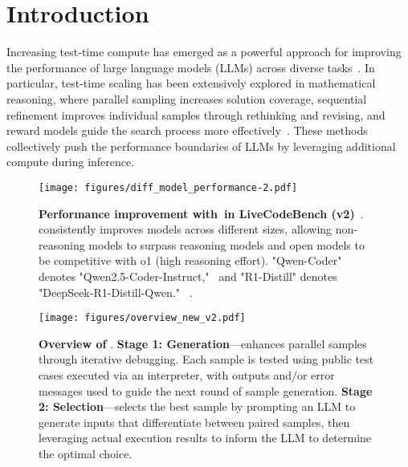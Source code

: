 \section{Introduction}
Increasing test-time compute has emerged as a powerful approach for improving the performance of large language models (LLMs) across diverse tasks~\citep{openai_learning_to_reason_2024, guo2025deepseek,qwen_qwq_2024,muennighoff2025s1,sky_t1_2025,brown2024large,snell2024scaling}. In particular, test-time scaling has been extensively explored in mathematical reasoning, where parallel sampling increases solution coverage, sequential refinement improves individual samples through rethinking and revising, and reward models guide the search process more effectively~\citep{ehrlich2025codemonkeys, snell2024scaling, li2024rethinkmcts}. These methods collectively push the performance boundaries of LLMs by leveraging additional compute during inference.
\begin{figure}[!t]
    \centering
    \texttt{[image: figures/diff\_model\_performance-2.pdf]}      \caption{\textbf{Performance improvement with~\frameworkname in LiveCodeBench (v2)}~\citep{jain2024livecodebench}. \frameworkname consistently improves models across different sizes, allowing non-reasoning models to surpass reasoning models and open models to be competitive with o1 (high reasoning effort). "Qwen-Coder" denotes "Qwen2.5-Coder-Instruct,"~\citep{hui2024qwen2} and "R1-Distill" denotes "DeepSeek-R1-Distill-Qwen." ~\citep{guo2025deepseek}. }%
    \label{fig:all_models_performance}
    \vspace{-5mm}
\end{figure}

\begin{figure*}[!t]
    \centering
    \texttt{[image: figures/overview\_new\_v2.pdf]}
\caption{
\textbf{Overview of \frameworkname}. \textbf{Stage 1: Generation}---\frameworkname enhances parallel samples through iterative debugging. Each sample is tested using public test cases executed via an interpreter, with outputs and/or error messages used to guide the next round of sample generation.
\textbf{Stage 2: Selection}---\frameworkname selects the best sample by prompting an LLM to generate inputs that differentiate between paired samples, then leveraging actual execution results to inform the LLM to determine the optimal choice.
}
\vspace{-5mm}
\label{fig:Design}
\end{figure*}



